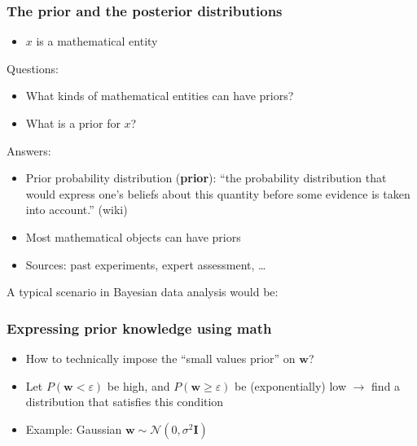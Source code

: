 \documentclass[usenames,dvipsnames,aspectratio=169]{beamer}
\begin{document}
\begin{frame}
\frametitle{The prior and the posterior distributions}

\begin{itemize}
  \item $x$ is a mathematical entity
\end{itemize}

\pause
Questions:
\begin{itemize}

  \item What kinds of mathematical entities can have priors? 
  \item What is a prior for $x$?

\end{itemize}

\pause
Answers:
\begin{itemize}
  \item Prior probability distribution (\textbf{prior}): 
  ``the probability distribution that would express one's beliefs about this quantity before some evidence is taken into account.'' (wiki)

  \item Most mathematical objects can have priors

  \pause
  \item Sources: past experiments, expert assessment, \ldots

\end{itemize}


A typical scenario in Bayesian data analysis would be:\\
\begin{center}\noindent{}
\end{center}

\end{frame}



\begin{frame}
\frametitle{Expressing prior knowledge using math}

\begin{itemize}

  \item How to technically impose the ``small values prior'' on $\mathbf{w}$? 

  \pause
  \item Let $P(\mathbf{w} < \varepsilon)$ be high,
  and $P(\mathbf{w} \geqslant \varepsilon)$ 
  be (exponentially) low $\to$ find a distribution
  that satisfies this condition

  \pause
  \item Example: Gaussian $\mathbf{w} \sim \mathcal{N}(0, \sigma^2 \bm{I})$


\end{itemize}



\end{frame}
\end{document}
